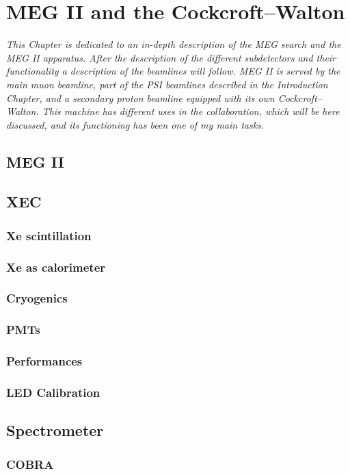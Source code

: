 \chapter{MEG II and the Cockcroft–Walton}
\begin{refsection}
{\itshape This Chapter is dedicated to an in-depth description of the MEG search and the MEG II apparatus. After the description of the different subdetectors and their functionality a description of the beamlines will follow. MEG II is served by the main muon beamline, part of the PSI beamlines described in the Introduction Chapter, and a secondary proton beamline equipped with its own Cockcroft–Walton. This machine has different uses in the collaboration, which will be here discussed, and its functioning has been one of my main tasks.}

\section{MEG II}
\section{XEC}
    \subsection{Xe scintillation}
    \subsection{Xe as calorimeter}
    \subsection{Cryogenics}
    \subsection{PMTs}
    \subsection{Performances}
    \subsection{LED Calibration}
    \label{LED}

\section{Spectrometer}
    \subsection{COBRA}
    \label{MEG:COBRA}

\end{refsection}
